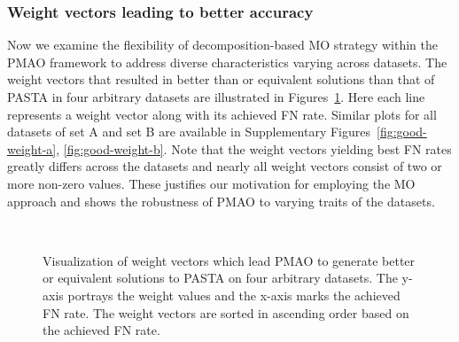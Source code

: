 \subsubsection{Weight vectors leading to better accuracy}
Now we examine the flexibility of decomposition-based MO strategy within the PMAO framework to address diverse characteristics varying across datasets. The weight vectors that resulted in better than or equivalent solutions than that of PASTA in four arbitrary datasets are illustrated in Figures~\ref{fig:good-weight}. Here each line represents a weight vector along with its achieved FN rate. Similar plots for all datasets of set A and set B are available in Supplementary Figures~\ref{fig:good-weight-a}, \ref{fig:good-weight-b}. Note that the weight vectors yielding best FN rates greatly differs across the datasets and nearly all weight vectors consist of two or more non-zero values. These justifies our motivation for employing the MO approach and shows the robustness of PMAO to varying traits of the datasets. 

\begin{figure}[!htbp]%
	\begin{adjustwidth}{-0.6cm}{}
		\centering
		\\
	\end{adjustwidth}
	\caption{Visualization of weight vectors which lead PMAO to generate better or equivalent solutions to PASTA on four arbitrary datasets. The y-axis portrays the weight values and the x-axis marks the achieved FN rate. The weight vectors are sorted in ascending order based on the achieved FN rate. }
	\label{fig:good-weight}
\end{figure}


